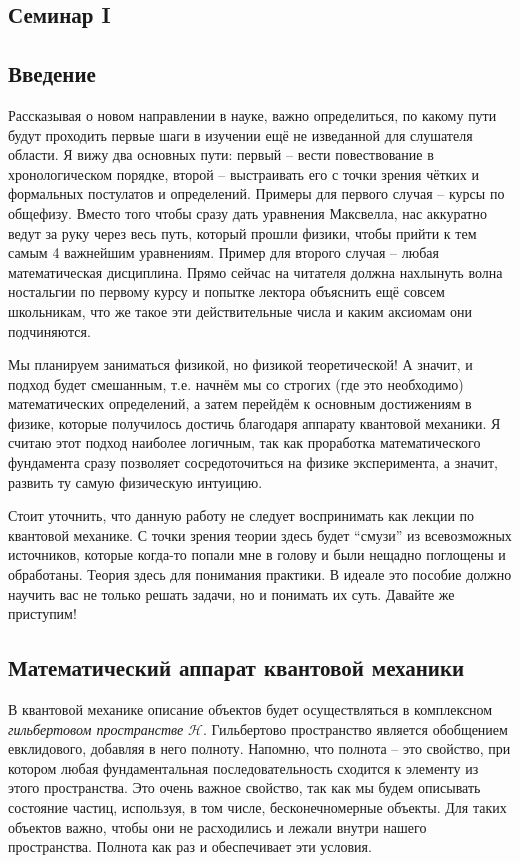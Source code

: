 \begin{center}
    \section{Семинар I}
\end{center}
\subsection{Введение}


\hspace{1em} Рассказывая о новом направлении в науке, важно определиться, по какому пути будут проходить первые шаги в изучении ещё не изведанной для слушателя области. Я вижу два основных пути: первый -- вести повествование в хронологическом порядке, второй -- выстраивать его с точки зрения чётких и формальных постулатов и определений. Примеры для первого случая -- курсы по общефизу. Вместо того чтобы сразу дать уравнения Максвелла, нас аккуратно ведут за руку через весь путь, который прошли физики, чтобы прийти к тем самым 4 важнейшим уравнениям. Пример для второго случая -- любая математическая дисциплина. Прямо сейчас на читателя должна нахлынуть волна ностальгии по первому курсу и попытке лектора объяснить ещё совсем школьникам, что же такое эти действительные числа и каким аксиомам они подчиняются.

Мы планируем заниматься физикой, но физикой теоретической! А значит, и подход будет смешанным, т.е. начнём мы со строгих (где это необходимо) математических определений, а затем перейдём к основным достижениям в физике, которые получилось достичь благодаря аппарату квантовой механики. Я считаю этот подход наиболее логичным, так как проработка математического фундамента сразу позволяет сосредоточиться на физике эксперимента, а значит, развить ту самую физическую интуицию.

Стоит уточнить, что данную работу не следует воспринимать как лекции по квантовой механике. С точки зрения теории здесь будет ``смузи'' из всевозможных источников, которые когда-то попали мне в голову и были нещадно поглощены и обработаны. Теория здесь для понимания практики. В идеале это пособие должно научить вас не только решать задачи, но и понимать их суть. Давайте же приступим!

\subsection{Математический аппарат квантовой механики}
\hspace{1em} В квантовой механике описание объектов будет осуществляться в комплексном \textit{гильбертовом пространстве} $\mathcal{H}$. Гильбертово пространство является обобщением евклидового, добавляя в него полноту. Напомню, что полнота -- это свойство, при котором любая фундаментальная последовательность сходится к элементу из этого пространства. Это очень важное свойство, так как мы будем описывать состояние частиц, используя, в том числе, бесконечномерные объекты. Для таких объектов важно, чтобы они не расходились и лежали внутри нашего пространства. Полнота как раз и обеспечивает эти условия. 

